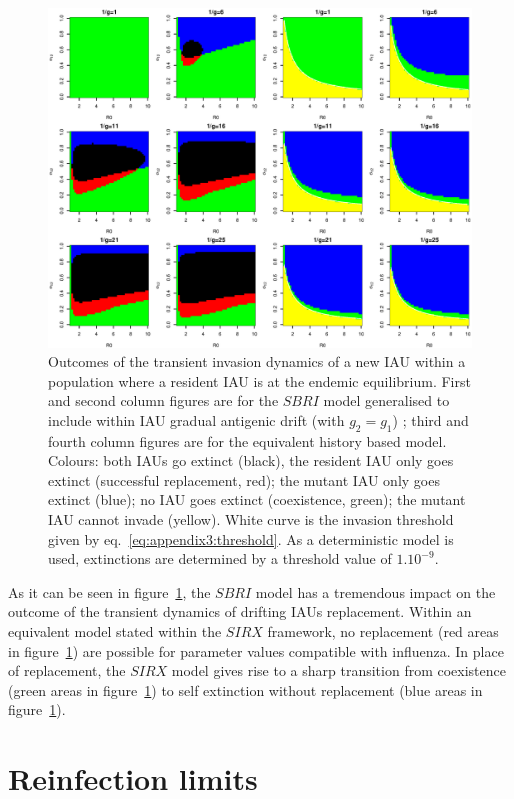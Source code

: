 \begin{figure}[!htbp]
  \center
  \includegraphics[width=0.8\linewidth]{texte/article3/appendix_diamond/graph/koelle_vs_purely_transiant.eps}
  \caption{Outcomes of the transient invasion dynamics of a new
    IAU within a population where a resident IAU
    is at the endemic equilibrium. First and second column figures are for
    the $SBRI$ model generalised to include within IAU
    gradual antigenic drift (with $g_2=g_1$) ; third and fourth
    column figures are for the equivalent history based model. Colours: both
    IAUs go extinct (black), the resident IAU only goes
    extinct (successful replacement, red); the mutant IAU only goes
    extinct (blue); no IAU goes extinct (coexistence, green); the
    mutant IAU cannot invade (yellow). White curve is the invasion
    threshold given by eq.~\eqref{eq:appendix3:threshold}. As a deterministic
    model is used, extinctions are determined by a threshold value of
    $1.10^{-9}.$}
  \label{fig:koelle_vs}
\end{figure}

As it can be seen in figure~\ref{fig:koelle_vs}, the $SBRI$ model has
a tremendous impact on the outcome of the transient dynamics of
drifting IAUs replacement. Within an equivalent model stated within
the $SIRX$ framework, no replacement (red areas in
figure~\ref{fig:koelle_vs}) are possible for parameter values
compatible with influenza. In place of replacement, the $SIRX$ model
gives rise to a sharp transition from coexistence (green areas in
figure~\ref{fig:koelle_vs}) to self extinction without replacement
(blue areas in figure~\ref{fig:koelle_vs}).



\section{Reinfection limits}

